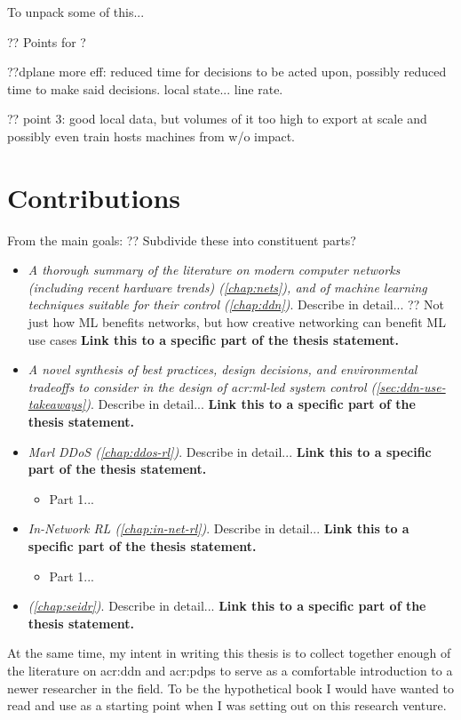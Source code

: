 To unpack some of this...

?? Points for ?

??dplane more eff: reduced time for decisions to be acted upon, possibly reduced time to make said decisions. local state... line rate.

?? point 3: good local data, but volumes of it too high  to export at scale and possibly even train hosts machines from w/o impact.


\section{Contributions}
From the main goals: ?? Subdivide these into constituent parts?
\begin{itemize}
	\item \emph{A thorough summary of the literature on modern computer networks (including recent hardware trends) (\cref{chap:nets}), and of machine learning techniques suitable for their control (\cref{chap:ddn})}. Describe in detail... ?? Not just how ML benefits networks, but how creative networking can benefit ML use cases \textbf{Link this to a specific part of the thesis statement.}
	\item \emph{A novel synthesis of best practices, design decisions, and environmental tradeoffs to consider in the design of \gls{acr:ml}-led system control (\cref{sec:ddn-use-takeaways})}. Describe in detail... \textbf{Link this to a specific part of the thesis statement.}
	\item \emph{Marl DDoS (\cref{chap:ddos-rl})}. Describe in detail... \textbf{Link this to a specific part of the thesis statement.}
	\begin{itemize}
		\item Part 1...
	\end{itemize}
	\item \emph{In-Network RL (\cref{chap:in-net-rl})}. Describe in detail... \textbf{Link this to a specific part of the thesis statement.}
	\begin{itemize}
		\item Part 1...
	\end{itemize}
	\item \emph{\seidr{} (\cref{chap:seidr})}. Describe in detail... \textbf{Link this to a specific part of the thesis statement.}
\end{itemize}

At the same time, my intent in writing this thesis is to collect together enough of the literature on \gls{acr:ddn} and \glspl{acr:pdp} to serve as a comfortable introduction to a newer researcher in the field.
To be the hypothetical book I would have wanted to read and use as a starting point when I was setting out on this research venture.

